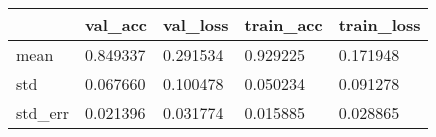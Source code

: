 \begin{tabular}{|l|l|l|l|l|}
\toprule \hline
 & val\_acc & val\_loss & train\_acc & train\_loss \\ \hline
\midrule
mean & 0.849337 & 0.291534 & 0.929225 & 0.171948 \\ \hline
std & 0.067660 & 0.100478 & 0.050234 & 0.091278 \\ \hline
std\_err & 0.021396 & 0.031774 & 0.015885 & 0.028865 \\ \hline
\bottomrule
\end{tabular}
